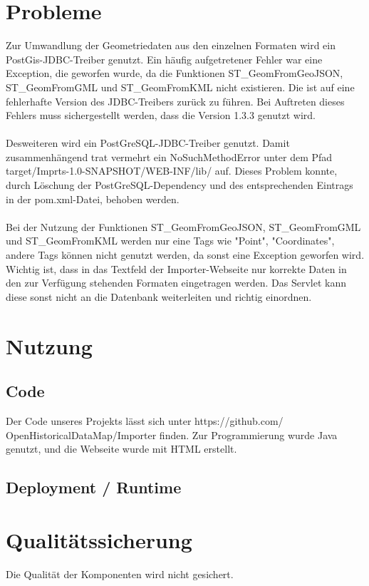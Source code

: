 \documentclass[]{article}
\begin{document}
\section{Probleme}
Zur Umwandlung der Geometriedaten aus den einzelnen Formaten wird ein PostGis-JDBC-Treiber genutzt. Ein häufig aufgetretener Fehler war eine Exception, die geworfen wurde, da die Funktionen ST\_GeomFromGeoJSON, \\ST\_GeomFromGML und ST\_GeomFromKML nicht existieren. Die ist auf eine fehlerhafte Version des JDBC-Treibers zurück zu führen. Bei Auftreten dieses Fehlers muss sichergestellt werden, dass die Version 1.3.3 genutzt wird.\\
\\

Desweiteren wird ein PostGreSQL-JDBC-Treiber genutzt. Damit zusammenhängend trat vermehrt ein NoSuchMethodError unter dem Pfad target/Imprts-1.0-SNAPSHOT/WEB-INF/lib/ auf. Dieses Problem konnte, durch Löschung der PostGreSQL-Dependency und des entsprechenden Eintrags in der pom.xml-Datei, behoben werden.\\
\\

Bei der Nutzung der Funktionen ST\_GeomFromGeoJSON, ST\_GeomFromGML und ST\_GeomFromKML werden nur eine Tags wie "Point", "Coordinates", andere Tags können nicht genutzt werden, da sonst eine Exception geworfen wird. Wichtig ist, dass in das Textfeld der Importer-Webseite nur korrekte Daten in den zur Verfügung stehenden Formaten eingetragen werden. Das Servlet kann diese sonst nicht an die Datenbank weiterleiten und richtig einordnen.

\section{Nutzung}
\subsection{Code}
Der Code unseres Projekts lässt sich unter https://github.com/\\OpenHistoricalDataMap/Importer finden. Zur Programmierung wurde Java genutzt, und die Webseite wurde mit HTML erstellt.

\subsection{Deployment / Runtime}

\section{Qualitätssicherung}
Die Qualität der Komponenten wird nicht gesichert. 
\end{document}

